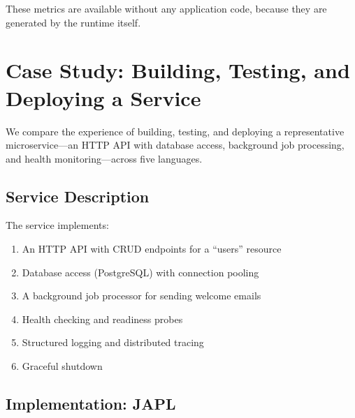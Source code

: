 \documentclass[11pt,twocolumn]{article}
\begin{document}
These metrics are available without any application code, because they are generated by the runtime itself.

\section{Case Study: Building, Testing, and Deploying a Service}
\label{sec:case-study}

We compare the experience of building, testing, and deploying a representative microservice---an HTTP API with database access, background job processing, and health monitoring---across five languages.

\subsection{Service Description}

The service implements:
\begin{enumerate}
\item An HTTP API with CRUD endpoints for a ``users'' resource
\item Database access (PostgreSQL) with connection pooling
\item A background job processor for sending welcome emails
\item Health checking and readiness probes
\item Structured logging and distributed tracing
\item Graceful shutdown
\end{enumerate}

\subsection{Implementation: JAPL}
\end{document}
